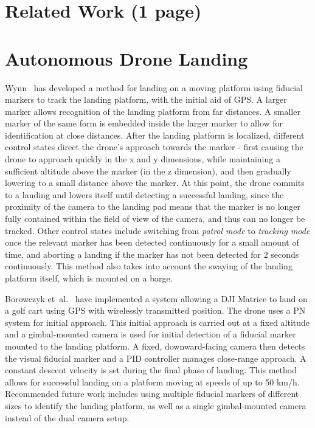 \section{Related Work (1 page)}

\section{Autonomous Drone Landing}

Wynn~\cite{wynn} has developed a method for landing on a moving platform using fiducial markers to track the landing platform, with the initial aid of GPS. A larger marker allows recognition of the landing platform from far distances. A smaller marker of the same form is embedded inside the larger marker to allow for identification at close distances. After the landing platform is localized, different control states direct the drone's approach towards the marker - first causing the drone to approach quickly in the x and y dimensions, while maintaining a sufficient altitude above the marker (in the z dimension), and then gradually lowering to a small distance above the marker. At this point, the drone commits to a landing and lowers itself until detecting a successful landing, since the proximity of the camera to the landing pad means that the marker is no longer fully contained within the field of view of the camera, and thus can no longer be tracked. Other control states include switching from \textit{patrol mode} to \textit{tracking mode} once the relevant marker has been detected continuously for a small amount of time, and aborting a landing if the marker has not been detected for 2 seconds continuously. This method also takes into account the swaying of the landing platform itself, which is mounted on a barge. 

Borowczyk et~al.~\cite{high_velocity_landing} have implemented a system allowing a DJI Matrice to land on a golf cart using  {GPS} with wirelessly transmitted position. The drone uses a {PN} system for initial approach. This initial approach is carried out at a fixed altitude and a gimbal-mounted camera is used for initial detection of a fiducial marker mounted to the landing platform. A fixed, downward-facing camera then detects the visual fiducial marker and a  {PID} controller manages close-range approach. A constant descent velocity is set during the final phase of landing. This method allows for successful landing on a platform moving at speeds of up to 50 km/h. Recommended future work includes using multiple fiducial markers of different sizes to identify the landing platform, as well as a single gimbal-mounted camera instead of the dual camera setup.

